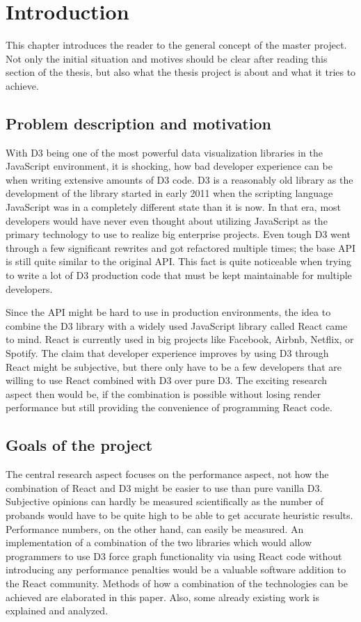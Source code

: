 \chapter{Introduction}
\label{cha:Introduction}

This chapter introduces the reader to the general concept of the master project. Not only the
initial situation and motives should be clear after reading this section of the thesis, but also
what the thesis project is about and what it tries to achieve.

\section{Problem description and motivation}

With D3 being one of the most powerful data visualization libraries in the JavaScript environment,
it is shocking, how bad developer experience can be when writing extensive amounts of D3 code. D3
is a reasonably old library as the development of the library started in early 2011 when the
scripting language JavaScript was in a completely different state than it is now. In that era, most
developers would have never even thought about utilizing JavaScript as the primary technology to
use to realize big enterprise projects. Even tough D3 went through a few significant rewrites and
got refactored multiple times; the base API is still quite similar to the original API. This fact
is quite noticeable when trying to write a lot of D3 production code that must be kept maintainable
for multiple developers.

Since the API might be hard to use in production environments, the idea to combine the D3 library
with a widely used JavaScript library called React came to mind. React is currently used in big
projects like Facebook, Airbnb, Netflix, or Spotify. The claim that developer experience improves
by using D3 through React might be subjective, but there only have to be a few developers that are
willing to use React combined with D3 over pure D3. The exciting research aspect then would be, if
the combination is possible without losing render performance but still providing the convenience
of programming React code.

\section{Goals of the project}

The central research aspect focuses on the performance aspect, not how the combination of React and
D3 might be easier to use than pure vanilla D3. Subjective opinions can hardly be measured
scientifically as the number of probands would have to be quite high to be able to get accurate
heuristic results. Performance numbers, on the other hand, can easily be measured. An
implementation of a combination of the two libraries which would allow programmers to use D3 force
graph functionality via using React code without introducing any performance penalties would be a
valuable software addition to the React community. Methods of how a combination of the technologies
can be achieved are elaborated in this paper. Also, some already existing work is explained and
analyzed.

